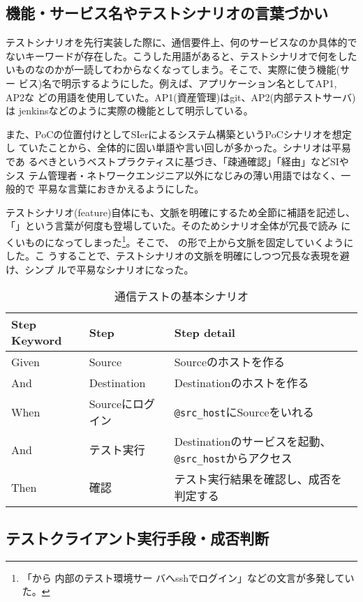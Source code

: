   \subsection{機能・サービス名やテストシナリオの言葉づかい}

テストシナリオを先行実装した際に、通信要件上、何のサービスなのか具体的で
ないキーワードが存在した。こうした用語があると、テストシナリオで何をした
いものなのかが一読してわからなくなってしまう。そこで、実際に使う機能(サー
ビス)名で明示するようにした。例えば、アプリケーション名としてAP1, AP2な
どの用語を使用していた。AP1(資産管理)はgit、AP2(内部テストサーバ)は
jenkinsなどのように実際の機能として明示している。

また、PoCの位置付けとしてSIerによるシステム構築というPoCシナリオを想定し
ていたことから、全体的に固い単語や言い回しが多かった。シナリオは平易であ
るべきというベストプラクティスに基づき、「疎通確認」「経由」などSIやシス
テム管理者・ネトワークエンジニア以外になじみの薄い用語ではなく、一般的で
平易な言葉におきかえるようにした。

テストシナリオ(feature)自体にも、文脈を明確にするため全節に補語を記述し、
「\yo 」という言葉が何度も登場していた。そのためシナリオ全体が冗長で読み
にくいものになってしまった\footnote{「\yo から \yo 内部のテスト環境サー
バへsshでログイン」などの文言が多発していた。}。そこで、
の形で上から文脈を固定していくようにした。こ
うすることで、テストシナリオの文脈を明確にしつつ冗長な表現を避け、シンプ
ルで平易なシナリオになった。

\begin{table}[h]
 \centering
 \caption{通信テストの基本シナリオ}
 \label{tab:basic_scenario}
 \begin{tabular}[t]{l|l|l}
  \hline
  Step Keyword & Step & Step detail \\
  \hline
  \hline
  Given & Source & Sourceのホストを作る \\
  And   & Destination & Destinationのホストを作る \\
  When  & Sourceにログイン & \verb|@src_host|にSourceをいれる \\
  And   & テスト実行 & Destinationのサービスを起動、\verb|@src_host|からアクセス \\
  Then & 確認 & テスト実行結果を確認し、成否を判定する \\
  \hline
 \end{tabular}
\end{table}


  \subsection{テストクライアント実行手段・成否判断}
  \label{sec:test-client-exec}

